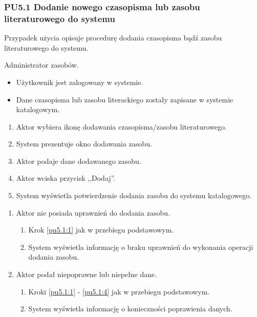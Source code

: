 \subsubsection{PU5.1 Dodanie nowego czasopisma lub zasobu literaturowego do systemu}

Przypadek użycia opisuje procedurę dodania czasopisma bądź zasobu literaturowego do systemu.

Administrator zasobów.

\begin{itemize}
\item Użytkownik jest zalogowany w systemie.
\end{itemize}

\begin{itemize}
\item Dane czasopisma lub zasobu literackiego zostały zapisane w systemie katalogowym.
\end{itemize}

\begin{enumerate}
\item \label{pu5.1:1} Aktor wybiera ikonę dodawania czasopisma/zasobu literaturowego.
\item System prezentuje okno dodawania zasobu.
\item Aktor podaje dane dodawanego zasobu.
\item \label{pu5.1:4} Aktor wciska przycisk ,,Dodaj''.
\item System wyświetla potwierdzenie dodania zasobu do systemu katalogowego.
\end{enumerate}

\begin{enumerate}
\item Aktor nie posiada uprawnień do dodania zasobu.
	\begin{enumerate}[label*=\arabic*.]
		\item Krok \ref{pu5.1:1} jak w przebiegu podstawowym.
		\item System wyświetla informację o braku uprawnień do wykonania operacji dodania zasobu.
	\end{enumerate}
\item Aktor podał niepoprawne lub niepełne dane.
	\begin{enumerate}[label*=\arabic*.]
		\item Kroki \ref{pu5.1:1} - \ref{pu5.1:4} jak w przebiegu podstawowym.
		\item System wyświetla informację o konieczności poprawienia danych.
	\end{enumerate}
\end{enumerate}

